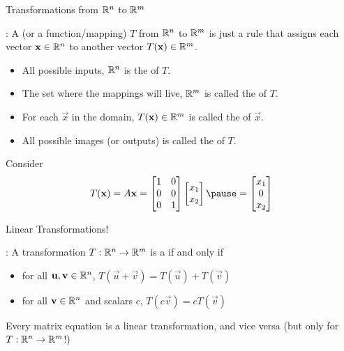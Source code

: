 \documentclass[xcoler=dvipsnames, aspectratio=169]{beamer}
\begin{document}
\begin{frame}{Transformations from $\mathbb{R}^n$ to $\mathbb{R}^m$}
    \begin{defn}
        : A  (or a function/mapping) $T$ from $\mathbb{R}^n$ to
        $\mathbb{R}^m$ is just a rule that assigns each vector $\mathbf{x}\in\mathbb{R}^n$ to another vector 
        $T(\mathbf{x})\in\mathbb{R}^m$.\pause
        \begin{itemize}
            \item All possible inputs, $\mathbb{R}^n$ is the  of $T$.\pause
            \item The set where the mappings will live, $\mathbb{R}^m$ is called the  of $T$.\pause
            \item For each $\vec{x}$ in the domain, $T(\mathbf{x})\in\mathbb{R}^m$ is called the 
                of $\vec{x}$.\pause
            \item All possible images (or outputs) is called the  of $T$.
        \end{itemize}
    \end{defn}
    \vspace{-5pt}
    \begin{example}
        Consider
        \[
            T(\vec{x}) = A\vec{x} = \begin{bmatrix}1&0\\0&0\\0&1\end{bmatrix}\begin{bmatrix}
                x_1\\x_2\end{bmatrix}\pause = \begin{bmatrix}x_1\\0\\x_2\end{bmatrix}
        \]
    \end{example}
\end{frame}
\begin{frame}{Linear Transformations!}
    \begin{defn}
        : A transformation $T:\mathbb{R}^n\rightarrow\mathbb{R}^m$ is a 
         if and only if 
        \begin{itemize}
            \item for all $\mathbf{u},\mathbf{v}\in\mathbb{R}^n$, $T(\vec{u}+\vec{v}) = T(\vec{u}) + T(\vec{v})$
            \item for all $\mathbf{v}\in\mathbb{R}^n$ and scalars $c$, $T(c\vec{v}) = cT(\vec{v})$
        \end{itemize}
    \end{defn}
    \pause
    \vspace{60pt}
    \begin{theorem}
        Every matrix equation is a linear transformation, and vice versa (but only for 
        $T:\mathbb{R}^n\rightarrow\mathbb{R}^m$!)
    \end{theorem}
\end{frame}
\end{document}
